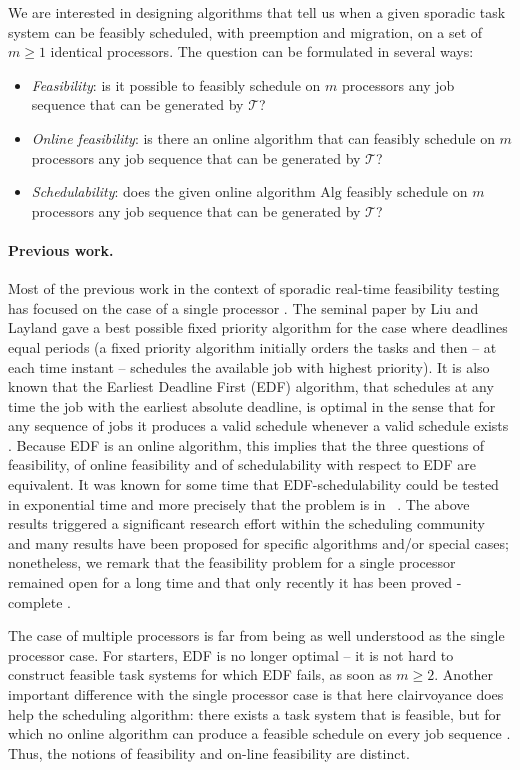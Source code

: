 \documentclass{llncs}
\newcommand{\tsys}{\ensuremath{\mathcal{T}}}
\newcommand{\conp}{\ccconp}
\begin{document}
We are interested in designing algorithms that tell us when a given sporadic task system can be feasibly scheduled, with preemption and migration, on a set of $m \ge 1$ identical processors. The question can be formulated in several ways: 
\begin{itemize}
\item \emph{Feasibility}: is it possible to feasibly schedule on $m$ processors any job sequence that can be generated by \tsys?  
\item \emph{Online feasibility}: is there an online algorithm that can feasibly schedule on $m$ processors any job sequence that can be generated by \tsys? 
\item \emph{Schedulability}: does the given online algorithm $\mathrm{Alg}$ feasibly schedule on $m$ processors any job sequence that can be generated by \tsys? 
\end{itemize}

\paragraph{Previous work.}
Most of the previous work in the context of sporadic real-time feasibility testing has focused on the case of a single processor \cite{Baruah:2003}. The seminal paper by Liu and Layland  \cite{Liu:1973} gave a best possible fixed priority algorithm for the case where deadlines equal periods (a fixed priority algorithm initially orders the tasks and then -- at each time instant -- schedules the available job with highest priority).  
It is also known that  the Earliest Deadline First (EDF) algorithm, that schedules at any time the job with the earliest absolute deadline, is optimal in the sense that for any sequence of jobs it produces a valid schedule whenever a valid schedule exists \cite{Dertouzos:1974}. Because EDF is an online algorithm, this implies that the three questions of feasibility, of online feasibility and of schedulability with respect to EDF are equivalent. It was known for some time that EDF-schedulability could be tested in exponential time and more precisely that the problem is in \conp\ \cite{Baruah:1990}. 
The above results triggered a significant research effort within the scheduling community and many results have been proposed for specific algorithms and/or special cases; nonetheless, we remark that the feasibility problem for a single processor remained open for a long time and that only recently it has been proved \conp-complete \cite{Eisenbrand:2010}. 


The case of multiple processors is far from being as well understood as the single processor case. For starters, EDF is no longer optimal -- it is not hard to construct feasible task systems for which EDF fails, as soon as $m \ge 2$.  Another important difference with the single processor case is that here clairvoyance does help the scheduling algorithm: there exists a task system that is feasible, but for which no online algorithm can produce a feasible schedule on every job sequence \cite{Fisher:2009}. Thus, the notions of feasibility and on-line feasibility are distinct.  
\end{document}
